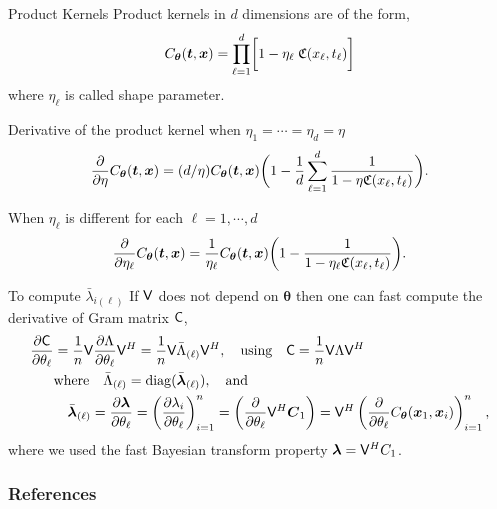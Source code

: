 \documentclass[handout, 10pt,compress,xcolor={usenames,dvipsnames}]{beamer} %
\newcommand{\bm}[1]{\boldsymbol{#1}}
\renewcommand{\mLambda}{\Lambda}
\newcommand{\vC}{\bvec{C}}
\renewcommand{\vtheta}{{\bm{\theta}}}
\begin{document}
\begin{frame}{Product Kernels}
	\vspace{-3ex}
	Product kernels in $d$ dimensions are of the form,
	\begin{align}
	\label{eqn:prod_kernel}
	C_{\vtheta}(\vt, \vx) = 
	\prod_{\ell=1}^d \biggl[ 1 - \eta_\ell \; \mathfrak{C}(x_\ell,t_\ell) \biggr]
	\end{align}
	where $\eta_\ell$ is called shape parameter.
	
	Derivative of the product kernel when $\eta_1=\cdots=\eta_d=\eta$
	\begin{align*}
	\frac{\partial}{\partial \eta} C_{\vtheta}(\vt, \vx) = ({d}/{\eta} ) C_{\vtheta}(\vt, \vx) 
	\biggl(
	1 - 
	\frac{1}{d} \sum_{\ell=1}^d
	\frac{1}
	{ 1 - \eta \mathfrak{C}(x_\ell,t_\ell) }
	\biggr).
	\end{align*}
	
	When $\eta_\ell$ is different for each $\ell = 1,\cdots,d$
	\begin{align*}
	\frac{\partial}{\partial \eta_\ell} C_{\vtheta}(\vt, \vx) = \frac{1}{\eta_\ell} 
	{ C_{\vtheta}(\vt, \vx) }
	\biggl(
	1 - 
	\frac{1}
	{ 1 - \eta_\ell \mathfrak{C}(x_\ell,t_\ell) }
	\biggr).
	\end{align*}
\end{frame}








\begin{frame}{To compute $\bar{\lambda}_{i(\ell)}$}
	If $\mathsf{V}$ does not depend on $\vtheta$ then one can fast compute the derivative of Gram matrix $\mathsf{C}$,
	\begin{align}
	\nonumber
	\displaystyle \frac{\partial \mC}{\partial \theta_\ell} 
	& = \frac 1n \mV \frac{\partial {\mLambda}}{\partial \theta_\ell} \mV^H
	= \frac 1n \mV \bar{\mLambda}_{(\ell)} \mV^H, \quad
	\text{using} \quad  \mC = \frac 1n \mV \mLambda \mV^H
	\\
	\nonumber
	& \text{where} \quad \bar{\mLambda}_{(\ell)} = \diag(\bar{\vlambda}_{(\ell)}), \quad \text{and}
	\\
	\label{eqn:deriv_eigenval_gram_matrix}
	&  \quad \bar{\vlambda}_{(\ell)} = \frac{\partial \vlambda}{\partial \theta_\ell} = \left( \frac{\partial \lambda_i}{\partial \theta_\ell} \right)_{i=1}^n 
	= \left( \frac{\partial }{\partial \theta_\ell} \mV^H {\vC_1} \right)
	= \mV^H \left( \frac{\partial }{\partial \theta_\ell} {C_\vtheta(\vx_1,\vx_i)} \right)_{i=1}^n,
	\end{align}
	where we used the fast Bayesian transform property $\boldsymbol{\lambda} = \mathsf{V}^H C_1$. %
\end{frame}












\begin{frame}[allowframebreaks]
	\frametitle{References}
	{}
\end{frame}
\end{document}
